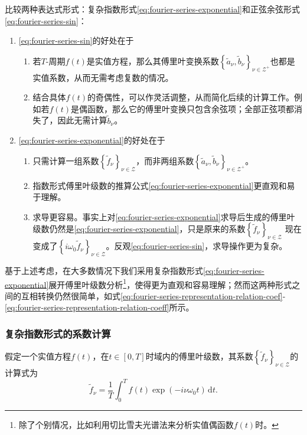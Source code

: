 比较两种表达式形式：复杂指数形式\eqref{eq:fourier-series-exponential}和正弦余弦形式\eqref{eq:fourier-series-sin}：
\begin{enumerate}
  \item \eqref{eq:fourier-series-sin}的好处在于
  \begin{enumerate}
    \item 若$T$-周期$f(t)$是实值方程，那么其傅里叶变换系数$\left\{ \tilde{a}_{\nu}, \tilde{b}_{\nu} \right\}_{\nu \in \mathcal{Z}^{+}}$也都是实值系数，从而无需考虑复数的情况。
    \item 结合具体$f(t)$的奇偶性，可以作灵活调整，从而简化后续的计算工作。例如若$f(t)$是偶函数，那么它的傅里叶变换只包含余弦项；全部正弦项都消失了，因此无需计算$\tilde{b}_{\nu}$。
  \end{enumerate}
  \item \eqref{eq:fourier-series-exponential}的好处在于
  \begin{enumerate}
    \item 只需计算一组系数$\left\{ \tilde{f}_{\nu} \right\}_{\nu \in \mathcal{Z}}$，而非两组系数$\left\{ \tilde{a}_{\nu}, \tilde{b}_{\nu} \right\}_{\nu \in \mathcal{Z}^{+}}$。
    \item 指数形式傅里叶级数的推算公式\eqref{eq:fourier-series-exponential}更直观和易于理解。
    \item 求导更容易。事实上对\eqref{eq:fourier-series-exponential}求导后生成的傅里叶级数仍然是\eqref{eq:fourier-series-exponential}，只是原来的系数$\left\{ \tilde{f}_{\nu} \right\}_{\nu \in \mathcal{Z}}$
    现在变成了$\left\{ i \omega_{0} \tilde{f}_{\nu} \right\}_{\nu \in \mathcal{Z}}$。反观\eqref{eq:fourier-series-sin}，求导操作更为复杂。
  \end{enumerate}
\end{enumerate}

基于上述考虑，在大多数情况下我们采用复杂指数形式\eqref{eq:fourier-series-exponential}展开傅里叶级数分析\footnote{除了个别情况，比如利用切比雪夫光谱法来分析实值偶函数$f(t)$时。}，使得更为直观和容易理解；然而这两种形式之间的互相转换仍然很简单，如式\eqref{eq:fourier-series-representation-relation-coef}-\eqref{eq:fourier-series-representation-relation-coeff}所示。

\subsubsection{复杂指数形式的系数计算}
\label{sec:fourier-series-expo-coef}
假定一个实值方程$f(t)$，在$t \in [0,T]$时域内的傅里叶级数，其系数$\left\{ \tilde{f}_{\nu} \right\}_{\nu \in \mathcal{Z}}$的计算式为
\begin{equation*}
  \tilde{f}_{\nu} = \frac{1}{T} \int_{0}^{T} f(t) \exp \left( - i \nu \omega_{0} t \right) \, \mathrm{d} t.
\end{equation*}


